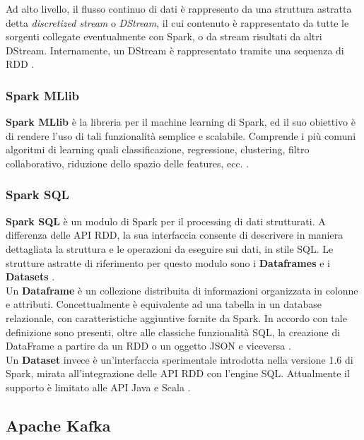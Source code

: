\documentclass[12pt]{article}
\begin{document}
Ad alto livello, il flusso continuo di dati è rappresento da una struttura astratta detta \textit{discretized stream} o \textit{DStream}, il cui contenuto è rappresentato da tutte le sorgenti collegate eventualmente con Spark, o da stream risultati da altri DStream. Internamente, un DStream è rappresentato tramite una sequenza di RDD \cite{spark}. 

\subsubsection{Spark MLlib}

\textbf{Spark MLlib} è la libreria per il machine learning di Spark, ed il suo obiettivo è di rendere l'uso di tali funzionalità semplice e scalabile. Comprende i più comuni algoritmi di learning quali classificazione, regressione, clustering, filtro collaborativo, riduzione dello spazio delle features, ecc. \cite{spark}. 

\subsubsection{Spark SQL}

\textbf{Spark SQL} è un modulo di Spark per il processing di dati strutturati. A differenza delle API RDD, la sua interfaccia consente di descrivere in maniera dettagliata la struttura e le operazioni da eseguire sui dati, in stile SQL. Le strutture astratte di riferimento per questo modulo sono i \textbf{Dataframes} e i \textbf{Datasets} \cite{spark}.\\

Un \textbf{Dataframe} è un collezione distribuita di informazioni organizzata in colonne e attributi. Concettualmente è equivalente ad una tabella in un database relazionale, con caratteristiche aggiuntive fornite da Spark. In accordo con tale definizione sono presenti, oltre alle classiche funzionalità SQL, la creazione di DataFrame a partire da un RDD o un oggetto JSON e viceversa \cite{spark}.\\

Un \textbf{Dataset} invece è un'interfaccia sperimentale introdotta nella versione 1.6 di Spark, mirata all'integrazione delle API RDD con l'engine SQL. Attualmente il supporto è limitato alle API Java e Scala \cite{spark}.

\subsection{Apache Kafka}
\end{document}
